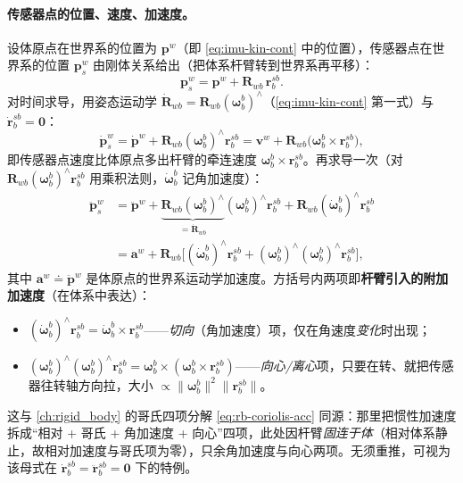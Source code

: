 \paragraph{传感器点的位置、速度、加速度。}
设体原点在世界系的位置为 $\mathbf p^w$（即 \cref{eq:imu-kin-cont} 中的位置），传感器点在世界系的位置 $\mathbf p_s^w$ 由刚体关系给出（把体系杆臂转到世界系再平移）：
\begin{equation}
  \mathbf p_s^w=\mathbf p^w+\mathbf R_{wb}\,\mathbf r_b^{sb}.
  \label{eq:imu-leverarm-pos}
\end{equation}
对时间求导，用姿态运动学 $\dot{\mathbf R}_{wb}=\mathbf R_{wb}(\boldsymbol\omega_b^b)^\wedge$（\cref{eq:imu-kin-cont} 第一式）与 $\dot{\mathbf r}_b^{sb}=\mathbf 0$：
\begin{equation}
  \dot{\mathbf p}_s^w=\dot{\mathbf p}^w+\mathbf R_{wb}(\boldsymbol\omega_b^b)^\wedge\mathbf r_b^{sb}
  =\mathbf v^w+\mathbf R_{wb}\big(\boldsymbol\omega_b^b\times\mathbf r_b^{sb}\big),
  \label{eq:imu-leverarm-vel}
\end{equation}
即传感器点速度比体原点多出杆臂的牵连速度 $\boldsymbol\omega_b^b\times\mathbf r_b^{sb}$。再求导一次（对 $\mathbf R_{wb}(\boldsymbol\omega_b^b)^\wedge\mathbf r_b^{sb}$ 用乘积法则，$\dot{\boldsymbol\omega}_b^b$ 记角加速度）：
\begin{align}
  \ddot{\mathbf p}_s^w
  &=\ddot{\mathbf p}^w
   +\underbrace{\mathbf R_{wb}(\boldsymbol\omega_b^b)^\wedge}_{=\dot{\mathbf R}_{wb}}(\boldsymbol\omega_b^b)^\wedge\mathbf r_b^{sb}
   +\mathbf R_{wb}(\dot{\boldsymbol\omega}_b^b)^\wedge\mathbf r_b^{sb}\nonumber\\
  &=\mathbf a^w
   +\mathbf R_{wb}\Big[(\dot{\boldsymbol\omega}_b^b)^\wedge\mathbf r_b^{sb}
   +(\boldsymbol\omega_b^b)^\wedge(\boldsymbol\omega_b^b)^\wedge\mathbf r_b^{sb}\Big],
  \label{eq:imu-leverarm-acc}
\end{align}
其中 $\mathbf a^w\doteq\ddot{\mathbf p}^w$ 是体原点的世界系运动学加速度。方括号内两项即\textbf{杆臂引入的附加加速度}（在体系中表达）：
\begin{itemize}
  \item $(\dot{\boldsymbol\omega}_b^b)^\wedge\mathbf r_b^{sb}=\dot{\boldsymbol\omega}_b^b\times\mathbf r_b^{sb}$——\emph{切向}（角加速度）项，仅在角速度\emph{变化}时出现；
  \item $(\boldsymbol\omega_b^b)^\wedge(\boldsymbol\omega_b^b)^\wedge\mathbf r_b^{sb}=\boldsymbol\omega_b^b\times(\boldsymbol\omega_b^b\times\mathbf r_b^{sb})$——\emph{向心/离心}项，只要在转、就把传感器往转轴方向拉，大小 $\propto\|\boldsymbol\omega_b^b\|^2\|\mathbf r_b^{sb}\|$。
\end{itemize}
这与 \cref{ch:rigid_body} 的哥氏四项分解 \cref{eq:rb-coriolis-acc} 同源：那里把惯性加速度拆成“相对 + 哥氏 + 角加速度 + 向心”四项，此处因杆臂\emph{固连于体}（相对体系静止，故相对加速度与哥氏项为零），只余角加速度与向心两项。无须重推，可视为该母式在 $\dot{\mathbf r}_b^{sb}=\ddot{\mathbf r}_b^{sb}=\mathbf 0$ 下的特例。


